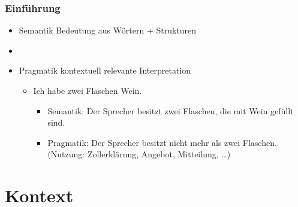 
\begin{frame}
\frametitle{Einführung}

\begin{itemize}
	\item Semantik \ras Bedeutung aus Wörtern + Strukturen
	\item[]
	\item Pragmatik \ras kontextuell relevante Interpretation
	
	\begin{itemize}
		\item Ich habe zwei Flaschen Wein.
		
		\begin{itemize}
			\item Semantik: Der Sprecher besitzt zwei Flaschen, die mit Wein gefüllt sind.
			\item Pragmatik: Der Sprecher besitzt nicht mehr als zwei Flaschen. (Nutzung: Zollerklärung, Angebot, Mitteilung, \dots)
		\end{itemize}
	\end{itemize}
\end{itemize}

\end{frame}


%
\section{Kontext}
%


